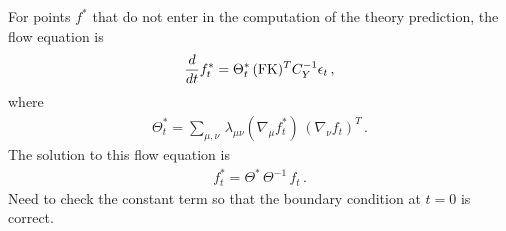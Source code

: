 \documentclass[11pt]{article}
\begin{document}
For points $f^*$ that do not enter in the computation of the theory prediction, the flow 
equation is
\begin{align}
    \label{eq:FlowStarLinearDataNTK}
    \frac{d}{dt} f^*_t = 
        \Theta^*_t\, (\mathrm{FK})^T C_Y^{-1} \epsilon_t\, ,
\end{align}
where 
\begin{align}
    \label{eq:NTKStarDef}
    \Theta^*_t = \sum_{\mu,\nu}\, \lambda_{\mu\nu} \left(\nabla_\mu f^*_t\right)\, 
    \left(\nabla_\nu f_t\right)^T\, .
\end{align}
The solution to this flow equation is
\begin{align}
    \label{eq:IntegrateFlowAtLeadingOrderStar}
    f^*_t = \Theta^*\, \Theta^{-1}\, f_t \, . 
\end{align}
Need to check the constant term so that the boundary condition at $t=0$ is correct. 





\appendix


\end{document}
